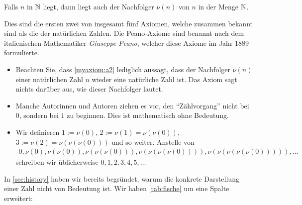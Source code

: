 \begin{myaxiom}\label{myaxiom:a2}
	Falls $n$ in $\mathbb{N}$ liegt, dann liegt auch der Nachfolger $\nu(n)$ von $n$ in der Menge $\mathbb{N}$.
\end{myaxiom}

\noindent
Dies sind die ersten zwei von insgesamt fünf Axiomen, welche zusammen bekannt sind als die  der natürlichen Zahlen. Die Peano-Axiome sind benannt nach dem italienischen Mathematiker \textit{Giuseppe Peano}, welcher diese Axiome im Jahr 1889 formulierte.

\begin{myremark}
  \phantom{0}
	\begin{itemize}
		\item Beachten Sie, dass \cref{myaxiom:a2} lediglich aussagt, dass der Nachfolger $\nu(n)$ einer natürlichen Zahl $n$ wieder eine natürliche Zahl ist. Das Axiom sagt nichts darüber aus, wie dieser Nachfolger lautet.
		\item Manche Autorinnen und Autoren ziehen es vor, den \enquote{Zählvorgang} nicht bei $0$, sondern bei $1$ zu beginnen. Dies ist mathematisch ohne Bedeutung. \cite{AmannEscher1}
		\item Wir definieren $1:=\nu(0)$, $2:=\nu(1)=\nu(\nu(0))$, $3:=\nu(2)=\nu(\nu(\nu(0)))$ und so weiter. Anstelle von
		      \begin{align*}
			      0, \nu(0), \nu(\nu(0)), \nu(\nu(\nu(0))), \nu(\nu(\nu(\nu(0)))), \nu(\nu(\nu(\nu(\nu(0))))), \ldots
		      \end{align*}
		      schreiben wir üblicherweise $0, 1, 2, 3, 4, 5, \ldots$
	\end{itemize}
\end{myremark}
\clearpage
In \cref{sec:history} haben wir bereits begründet, warum die konkrete Darstellung einer Zahl nicht von Bedeutung ist. Wir haben \cref{tab:fische} um eine Spalte erweitert:

